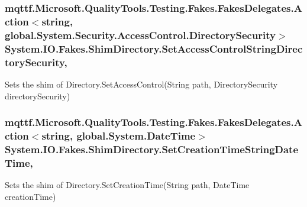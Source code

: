 \hypertarget{class_system_1_1_i_o_1_1_fakes_1_1_shim_directory_a50127b56a9555568d66a48860401097c}{
\subsubsection[{Set\-Access\-Control\-String\-Directory\-Security}]{\setlength{\rightskip}{0pt plus 5cm}mqttf.\-Microsoft.\-Quality\-Tools.\-Testing.\-Fakes.\-Fakes\-Delegates.\-Action$<$string, global.\-System.\-Security.\-Access\-Control.\-Directory\-Security$>$ System.\-I\-O.\-Fakes.\-Shim\-Directory.\-Set\-Access\-Control\-String\-Directory\-Security\hspace{0.3cm}{\ttfamily [static]}, {\ttfamily [set]}}}\label{class_system_1_1_i_o_1_1_fakes_1_1_shim_directory_a50127b56a9555568d66a48860401097c}


Sets the shim of Directory.\-Set\-Access\-Control(\-String path, Directory\-Security directory\-Security)

\hypertarget{class_system_1_1_i_o_1_1_fakes_1_1_shim_directory_a32355f10aefeb9ab164ac4693a0b9294}{
\subsubsection[{Set\-Creation\-Time\-String\-Date\-Time}]{\setlength{\rightskip}{0pt plus 5cm}mqttf.\-Microsoft.\-Quality\-Tools.\-Testing.\-Fakes.\-Fakes\-Delegates.\-Action$<$string, global.\-System.\-Date\-Time$>$ System.\-I\-O.\-Fakes.\-Shim\-Directory.\-Set\-Creation\-Time\-String\-Date\-Time\hspace{0.3cm}{\ttfamily [static]}, {\ttfamily [set]}}}\label{class_system_1_1_i_o_1_1_fakes_1_1_shim_directory_a32355f10aefeb9ab164ac4693a0b9294}


Sets the shim of Directory.\-Set\-Creation\-Time(\-String path, Date\-Time creation\-Time)

